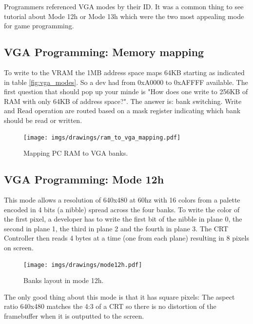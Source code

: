 \documentclass[book.tex]{subfiles}
\begin{document}
 Programmers referenced VGA modes by their ID. It was a common thing to see tutorial about Mode 12h or Mode 13h which were the two most appealing mode for game programming.


 \subsection{VGA Programming: Memory mapping}
To write to the VRAM the 1MB address space maps 64KB starting as indicated in table \ref{fig:vga_modes}. So a dev had from 0xA0000 to 0xAFFFF available. The first question that should pop up your minde is "How does one write to 256KB of RAM with only 64KB of address space?". The answer is: bank switching. Write and Read operation are routed based on a mask register indicating which bank should be read or written.\\
\par
 \begin{figure}[H]
\centering
  
      \texttt{[image: imgs/drawings/ram\_to\_vga\_mapping.pdf]}
    
\caption{Mapping PC RAM to VGA banks.}
\end{figure}



 

 \subsection{VGA Programming: Mode 12h}
 This mode allows a resolution of 640x480 at 60hz with 16 colors from a palette encoded in 4 bits (a nibble) spread across the four banks. To write the color of the first pixel, a developer has to write the first bit of the nibble in plane 0, the second in plane 1, the third in plane 2 and the fourth in plane 3. The CRT Controller then reads 4 bytes at a time (one from each plane) resulting in 8 pixels on screen.\\
\par
\begin{figure}[H]
\centering
 \texttt{[image: imgs/drawings/mode12h.pdf]}
\caption{Banks layout in mode 12h.}
\end{figure}
\par

The only good thing about this mode is that it has square pixels: The aspect ratio 640x480 matches the 4:3 of a CRT so there is no distortion of the framebuffer when it is outputted to the screen.\\
\par
\end{document}
